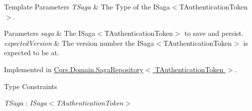 \begin{DoxyTemplParams}{Template Parameters}
{\em T\+Saga} & The Type of the I\+Saga$<$\+T\+Authentication\+Token$>$.\\
\hline
\end{DoxyTemplParams}

\begin{DoxyParams}{Parameters}
{\em saga} & The I\+Saga$<$\+T\+Authentication\+Token$>$ to save and persist.\\
\hline
{\em expected\+Version} & The version number the I\+Saga$<$\+T\+Authentication\+Token$>$ is expected to be at.\\
\hline
\end{DoxyParams}


Implemented in \hyperlink{classCqrs_1_1Domain_1_1SagaRepository_a84cae424cb01de22864ae7d960007cd0_a84cae424cb01de22864ae7d960007cd0}{Cqrs.\+Domain.\+Saga\+Repository$<$ T\+Authentication\+Token $>$}.

\begin{Desc}
\item[Type Constraints]\begin{description}
\item[{\em T\+Saga} : {\em I\+Saga$<$T\+Authentication\+Token$>$}]\end{description}
\end{Desc}
